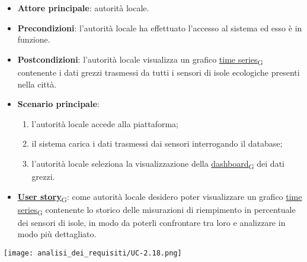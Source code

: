 \begin{itemize}
	\item \textbf{Attore principale}: autorità locale.
	\item \textbf{Precondizioni}: l'autorità locale ha effettuato l'accesso al sistema ed esso è in funzione.
	\item \textbf{Postcondizioni}: l'autorità locale visualizza un grafico \href{https://7last.github.io/docs/pb/documentazione-interna/glossario\#time-series}{time series\textsubscript{G}} contenente i dati grezzi trasmessi da tutti i sensori
	      di isole ecologiche presenti nella città.
	\item \textbf{Scenario principale}:
	      \begin{enumerate}
		      \item l'autorità locale accede alla piattaforma;
		      \item il sistema carica i dati trasmessi dai sensori interrogando il database;
		      \item l'autorità locale seleziona la visualizzazione della \href{https://7last.github.io/docs/pb/documentazione-interna/glossario\#dashboard}{dashboard\textsubscript{G}} dei dati grezzi.
	      \end{enumerate}
	\item \href{https://7last.github.io/docs/pb/documentazione-interna/glossario\#user-story}{\textbf{User story}\textsubscript{G}}:
	      come autorità locale desidero poter visualizzare un grafico \href{https://7last.github.io/docs/pb/documentazione-interna/glossario\#time-series}{time series\textsubscript{G}} contenente lo storico delle misurazioni di riempimento in percentuale
	      dei sensori di isole, in modo da poterli confrontare tra loro e analizzare in modo più dettagliato.
\end{itemize}
\begin{center}
	\texttt{[image: analisi\_dei\_requisiti/UC-2.18.png]}
\end{center}


